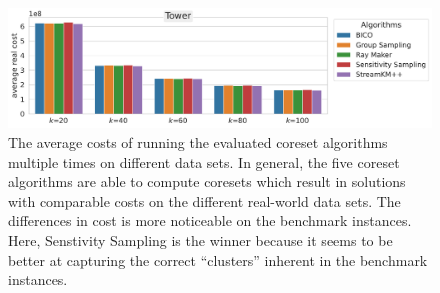 \begin{figure}
  \caption{The average costs of running the evaluated coreset algorithms multiple times on different data sets. In general, the five coreset algorithms are able to compute coresets which result in solutions with comparable costs on the different real-world data sets. The differences in cost is more noticeable on the benchmark instances. Here, Senstivity Sampling is the winner because it seems to be better at capturing the correct ``clusters'' inherent in the benchmark instances.}
  \label{fig:real-costs}
  \includegraphics[width=.67\linewidth]{figures/real-costs-Tower.pdf}
  \newline
  \newline\newline
\end{figure}
